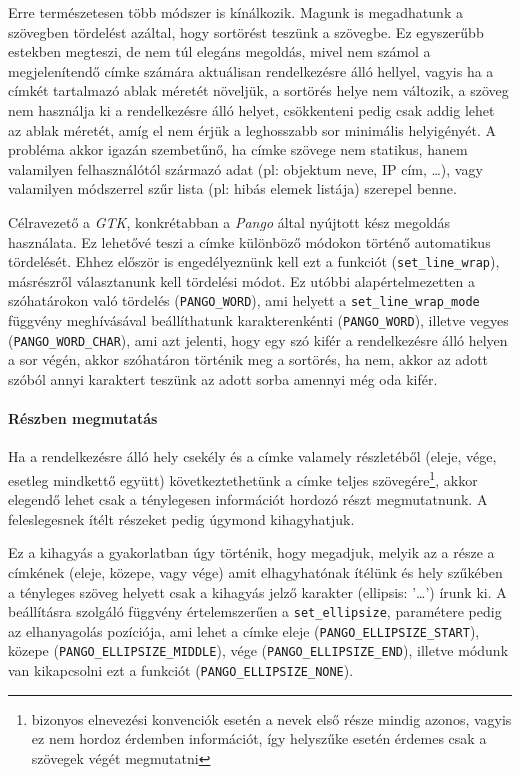 Erre természetesen több módszer is kínálkozik. Magunk is megadhatunk a szövegben tördelést azáltal, hogy sortörést teszünk a szövegbe. Ez egyszerűbb estekben megteszi, de nem túl elegáns megoldás, mivel nem számol a megjelenítendő címke számára aktuálisan rendelkezésre álló hellyel, vagyis ha a címkét tartalmazó ablak méretét növeljük, a sortörés helye nem változik, a szöveg nem használja ki a rendelkezésre álló helyet, csökkenteni pedig csak addig lehet az ablak méretét, amíg el nem érjük a leghosszabb sor minimális helyigényét. A probléma akkor igazán szembetűnő, ha címke szövege nem statikus, hanem valamilyen felhasználótól származó adat (pl: objektum neve, IP cím, \dots ), vagy valamilyen módszerrel szűr lista (pl: hibás elemek listája) szerepel benne.

Célravezető a \textit{GTK}, konkrétabban a \textit{Pango} által nyújtott kész megoldás használata. Ez lehetővé teszi a címke különböző módokon történő automatikus tördelését. Ehhez először is engedélyeznünk kell ezt a funkciót (\texttt{set\_line\_wrap}), másrészről választanunk kell tördelési módot. Ez utóbbi alapértelmezetten a szóhatárokon való tördelés (\texttt{PANGO\_WORD}), ami helyett a \texttt{set\_line\_wrap\_mode} függvény meghívásával beállíthatunk karakterenkénti (\texttt{PANGO\_WORD}), illetve vegyes (\texttt{PANGO\_WORD\_CHAR}), ami azt jelenti, hogy egy szó kifér a rendelkezésre álló helyen a sor végén, akkor szóhatáron történik meg a sortörés, ha nem, akkor az adott szóból annyi karaktert teszünk az adott sorba amennyi még oda kifér.

\paragraph{Részben megmutatás}

Ha a rendelkezésre álló hely csekély és a címke valamely részletéből (eleje, vége, esetleg mindkettő együtt) következtethetünk a címke teljes szövegére\footnote{bizonyos elnevezési konvenciók esetén a nevek első része mindig azonos, vagyis ez nem hordoz érdemben információt, így helyszűke esetén érdemes csak a szövegek végét megmutatni}, akkor elegendő lehet csak a ténylegesen információt hordozó részt megmutatnunk. A feleslegesnek ítélt részeket pedig úgymond kihagyhatjuk.

Ez a kihagyás a gyakorlatban úgy történik, hogy megadjuk, melyik az a része a címkének (eleje, közepe, vagy vége) amit elhagyhatónak ítélünk és hely szűkében a tényleges szöveg helyett csak a kihagyás jelző karakter (ellipsis: '\dots ') írunk ki. A beállításra szolgáló függvény értelemszerűen a \texttt{set\_ellipsize}, paramétere pedig az elhanyagolás pozíciója, ami lehet a címke eleje (\texttt{PANGO\_ELLIPSIZE\_START}), közepe (\texttt{PANGO\_ELLIPSIZE\_MIDDLE}), vége (\texttt{PANGO\_ELLIPSIZE\_END}), illetve módunk van kikapcsolni ezt a funkciót (\texttt{PANGO\_ELLIPSIZE\_NONE}).

